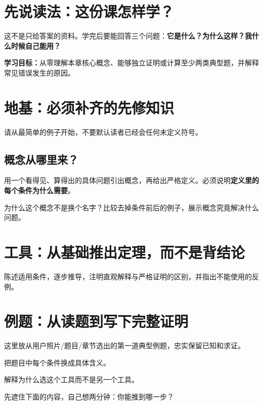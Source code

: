 \documentclass[12pt,a4paper,UTF8,fontset=none]{ctexart}
\begin{document}
\CourseCover

\section*{先说读法：这份课怎样学？}
这不是只给答案的资料。学完后要能回答三个问题：\textbf{它是什么？为什么这样？我什么时候自己能用？}

\begin{takeawaybox}
\textbf{学习目标：}从零理解本章核心概念、能够独立证明或计算至少两类典型题，并解释常见错误发生的原因。
\end{takeawaybox}

\tableofcontents
\clearpage

\section{地基：必须补齐的先修知识}
请从最简单的例子开始，不要默认读者已经会任何未定义符号。

\subsection{概念从哪里来？}
用一个看得见、算得出的具体问题引出概念，再给出严格定义。必须说明\textbf{定义里的每个条件为什么需要}。

\begin{whybox}
为什么这个概念不是换个名字？比较去掉条件前后的例子，展示概念究竟解决什么问题。
\end{whybox}

\section{工具：从基础推出定理，而不是背结论}
陈述适用条件，逐步推导，注明直观解释与严格证明的区别，并指出不能使用的反例。

\section{例题：从读题到写下完整证明}
\begin{questionbox}
这里放从用户照片/题目/章节选出的第一道典型例题，忠实保留已知和求证。
\end{questionbox}

 把题目中每个条件换成具体含义。

 解释为什么选这个工具而不是另一个工具。

\begin{trybox}
先遮住下面的内容，自己想两分钟：你能推到哪一步？
\end{trybox}
\end{document}
